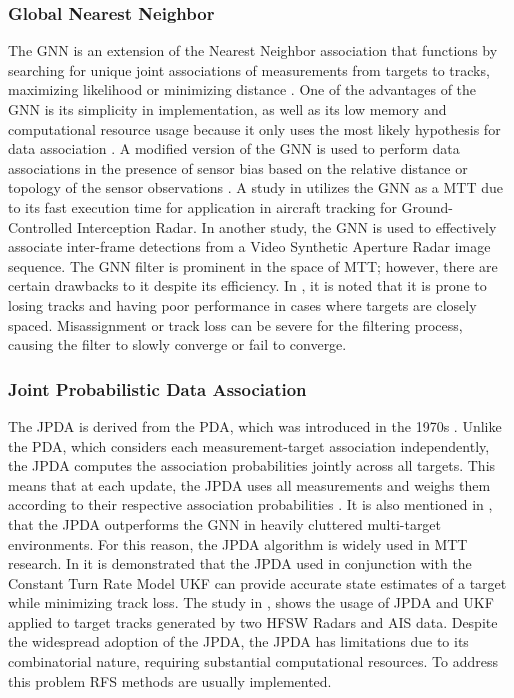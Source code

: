 \subsubsection{Global Nearest Neighbor}
The \ac{GNN} is an extension of the Nearest Neighbor association that functions by searching for unique joint associations of measurements from targets to tracks, maximizing likelihood or minimizing distance \cite{Stevens2011}. One of the advantages of the \ac{GNN} is its simplicity in implementation, as well as its low memory and computational resource usage because it only uses the most likely hypothesis for data association \cite{Shi2013}. A modified version of the \ac{GNN} is used to perform data associations in the presence of sensor bias based on the relative distance or topology of the sensor observations \cite{Shi2013}. A study in \cite{Saputra2023} utilizes the \ac{GNN} as a \ac{MTT} due to its fast execution time for application in aircraft tracking for Ground-Controlled Interception \ac{Radar}. In another study, the \ac{GNN} is used to effectively associate inter-frame detections from a Video Synthetic Aperture \ac{Radar} image sequence. The \ac{GNN} filter is prominent in the space of \ac{MTT}; however, there are certain drawbacks to it despite its efficiency. In \cite{Smith2019}, it is noted that it is prone to losing tracks and having poor performance in cases where targets are closely spaced. Misassignment or track loss can be severe for the filtering process, causing the filter to slowly converge or fail to converge.

\subsubsection{Joint Probabilistic Data Association }
The \ac{JPDA} is derived from the \ac{PDA}, which was introduced in the 1970s \cite{Bar-Shalom1974}. Unlike the \ac{PDA}, which considers each measurement-target association independently, the \ac{JPDA} computes the association probabilities jointly across all targets. This means that at each update, the \ac{JPDA} uses all measurements and weighs them according to their respective association probabilities \cite{OnderBozdogan2016a}. It is also mentioned in \cite{Blackman}, that the \ac{JPDA}  outperforms the \ac{GNN} in heavily cluttered multi-target environments. For this reason, the \ac{JPDA} algorithm is widely used in \ac{MTT} research. In \cite{Khalil2016} it is demonstrated that the \ac{JPDA} used in conjunction with the Constant Turn Rate Model \ac{UKF} can provide accurate state estimates of a target while minimizing track loss. The study in \cite{Braca2012}, shows the usage of \ac{JPDA} and \ac{UKF} applied to target tracks generated by two \ac{HFSW} \ac{Radar}s and \ac{AIS} data. Despite the widespread adoption of the \ac{JPDA}, the \ac{JPDA} has limitations due to its combinatorial nature, requiring substantial computational resources. To address this problem \ac{RFS} methods are usually implemented.

